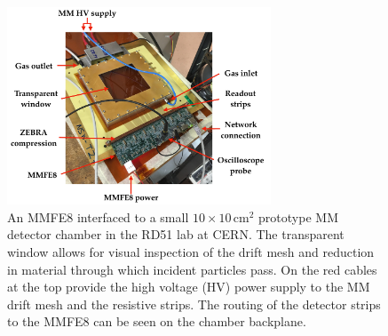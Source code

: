 \begin{figure}[!htb]
    \begin{center}
        \includegraphics[width=0.7\textwidth]{figures/nsw/frontend/mmfe8_t2_labelledPDF}
        \caption{
            An MMFE8 interfaced to a small $10\times10$\,cm$^2$ prototype MM detector chamber
            in the RD51 lab at CERN.
            The transparent window allows for visual inspection of the drift mesh and
            reduction in material through which incident particles pass.
            On the red cables at the top provide the high voltage (HV) power supply to the
            MM drift mesh and the resistive strips.
            The routing of the detector strips to the MMFE8 can be seen on the chamber backplane.
        }
        \label{fig:mmfe8_t2}
    \end{center}
\end{figure}

